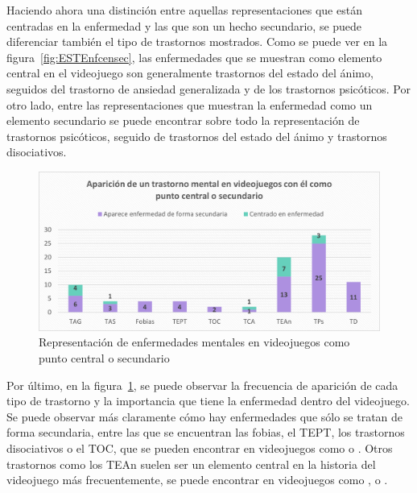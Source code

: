 \documentclass[12pt, a4paper,twoside,titlepage]{book}
\begin{document}
Haciendo ahora una distinción entre aquellas representaciones que están centradas en la enfermedad y las que son un hecho secundario, se puede diferenciar también el tipo de trastornos mostrados. Como se puede ver en la figura~\ref{fig:ESTEnfcensec}, las enfermedades que se muestran como elemento central en el videojuego son generalmente trastornos del estado del ánimo, seguidos del trastorno de ansiedad generalizada y de los trastornos psicóticos. Por otro lado, entre las representaciones que muestran la enfermedad como un elemento secundario se puede encontrar sobre todo la representación de trastornos psicóticos, seguido de trastornos del estado del ánimo y trastornos disociativos. 



\begin{figure}
    \centering
    \includegraphics[width=1\linewidth]{Graficas estudio/G6; Enfcentralsecund.png}
    \caption{Representación de enfermedades mentales en videojuegos como punto central o secundario}
    \label{fig:ESTEnfvidcensec}
\end{figure}


    
Por último, en la figura~\ref{fig:ESTEnfvidcensec}, se puede observar la frecuencia de aparición de cada tipo de trastorno y la importancia que tiene la enfermedad dentro del videojuego. Se puede observar más claramente cómo hay enfermedades que sólo se tratan de forma secundaria, entre las que se encuentran las fobias, el TEPT, los trastornos disociativos o el TOC, que se pueden encontrar en videojuegos como  o  . Otros trastornos como los TEAn suelen ser un elemento central en la historia del videojuego más frecuentemente, se puede encontrar en videojuegos como ,  o . 
\end{document}
